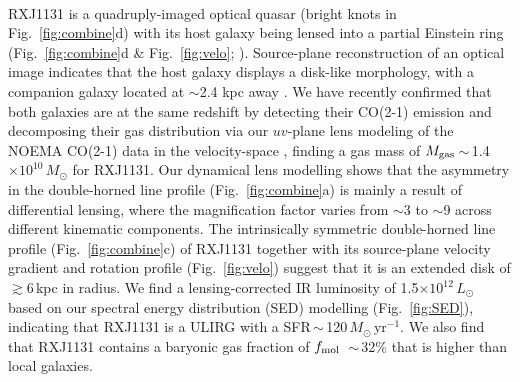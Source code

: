 \documentclass[11pt,a4paper,twoside,graphicx,color]{article}
\newcommand{\Lsun}{\mbox{$L_{\odot}$}\xspace}
\newcommand{\LIR}{\mbox{$L_{\rm IR}$}\xspace}
\newcommand{\Msun}{\mbox{$M_{\odot}$}\xspace}
\newcommand{\sfrU}{\mbox{\Msun\,yr$^{-1}$}\xspace}
\newcommand{\bco}{\mbox{CO(2-1)}\xspace}
\newcommand{\Fig}[1]{Fig.~\ref{fig:#1}}
\newcommand{\E}[1]{\mbox{$\times10^{#1}$}}
\newcommand{\eq}{\,=\,}
\newcommand{\ssim}{\,$\sim$\,}
\begin{document}
\vspace{0.3em}
\\
\indent 
RXJ1131 is a quadruply-imaged optical quasar (bright knots in \Fig{combine}d) 
with its host galaxy being lensed
into a partial Einstein ring (\Fig{combine}d \& \Fig{velo}; \citealt{Sluse03a}). 
Source-plane reconstruction 
of an optical image indicates that the host galaxy displays a disk-like morphology, with
a companion galaxy located at $\sim$2.4 kpc away 
\citep[\Fig{combine}f;][]{Claeskens06a, Brewer08a}.
We have recently confirmed that both galaxies are at the same redshift by detecting their
\bco emission and decomposing their gas distribution
via our $uv$-plane lens modeling
of the NOEMA \bco data
 in the velocity-space \citep[\Fig{combine}c \& e;][]{Leung16b}, finding a gas mass of 
$M_{\rm gas}$\ssim1.4\E{10}\,\Msun for RXJ1131.
Our dynamical lens modelling 
shows that the asymmetry in the double-horned line profile (\Fig{combine}a)
is mainly a result of differential lensing, where
the magnification factor varies from $\sim$3 to $\sim$9 across
different kinematic components.
The intrinsically symmetric double-horned line
profile (\Fig{combine}c) of RXJ1131 together with its source-plane velocity gradient 
and rotation profile (\Fig{velo}) 
suggest that it is an extended disk of $\gtrsim$6\,kpc in radius.
We find a lensing-corrected IR luminosity of 1.5\E{12}\,\Lsun based
on our spectral energy distribution (SED) modelling (\Fig{SED}), 
indicating that RXJ1131 is a ULIRG with a SFR\ssim120\,\sfrU.
We also find that
RXJ1131 contains  
a baryonic gas fraction of $f_{\rm mol}$
\ssim32\%
that is higher than local galaxies.
\end{document}

